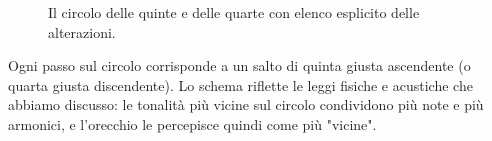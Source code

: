 \begin{figure}[H]
	\caption{Il circolo delle quinte e delle quarte con elenco esplicito delle alterazioni.}
	\label{fig:circolo_quinte_migliorato_compatto}
\end{figure}

Ogni passo sul circolo corrisponde a un salto di quinta giusta ascendente (o quarta giusta discendente). Lo schema riflette le leggi fisiche e acustiche che abbiamo discusso: le tonalità più vicine sul circolo condividono più note e più armonici, e l'orecchio le percepisce quindi come più "vicine".

